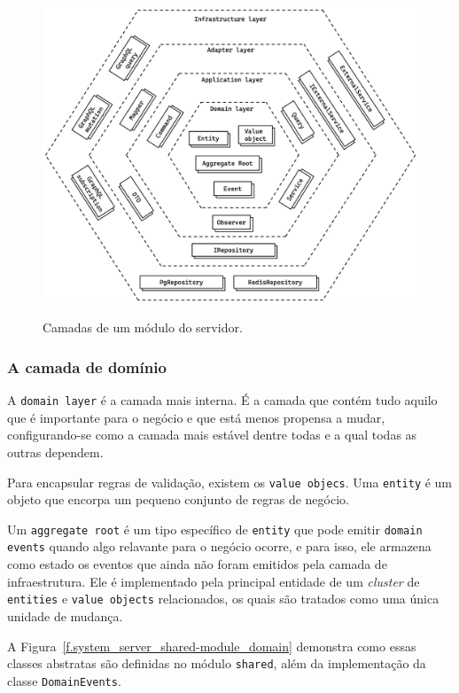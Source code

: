 \begin{figure}[h]
	\caption{\small Camadas de um módulo do servidor.}
	\centering
	\includegraphics[width=\textwidth]{../diagrams/out/system_server_each-module_layers.png}
	\label{f.system_server_each-module_layers}
\end{figure}

\subsubsection{A camada de domínio}

A \texttt{domain layer} é a camada mais interna. É a camada que contém tudo aquilo que é importante para o negócio e que está menos propensa a mudar, configurando-se como a camada mais estável dentre todas e a qual todas as outras dependem.

Para encapsular regras de validação, existem os \texttt{value objecs}. Uma \texttt{entity} é um objeto que encorpa um pequeno conjunto de regras de negócio.

Um \texttt{aggregate root} é um tipo específico de \texttt{entity} que pode emitir \texttt{domain events} quando algo relavante para o negócio ocorre, e para isso, ele armazena como estado os eventos que ainda não foram emitidos pela camada de infraestrutura. Ele é implementado pela principal entidade de um \emph{cluster} de \texttt{entities} e \texttt{value objects} relacionados, os quais são tratados como uma única unidade de mudança.

A Figura~\ref{f.system_server_shared-module_domain} demonstra como essas classes abstratas são definidas no módulo \texttt{shared}, além da implementação da classe \texttt{DomainEvents}.

